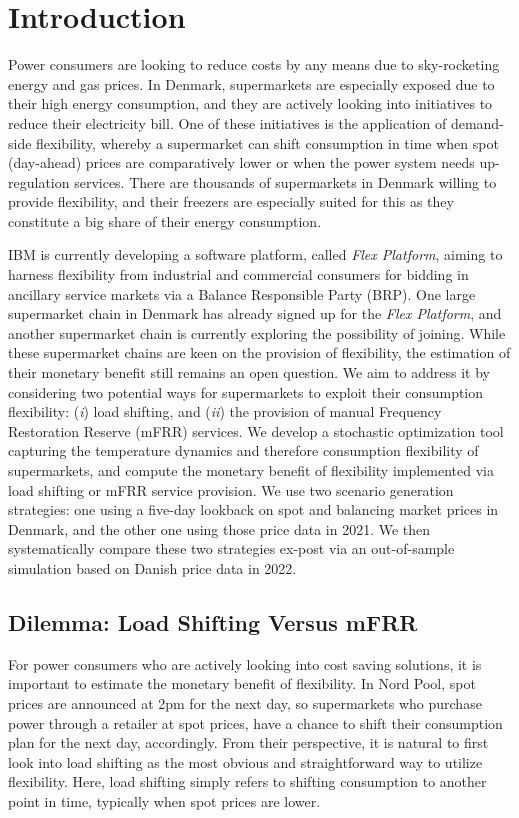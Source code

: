 \documentclass[11pt,a4paper]{article}
\begin{document}
\section{Introduction}


Power consumers are looking to reduce costs by any means due to sky-rocketing energy and gas prices. In Denmark, supermarkets are especially exposed due to their high energy consumption, and they are actively looking into initiatives to reduce their electricity bill. One of these initiatives is the application of demand-side flexibility, whereby a supermarket can shift consumption in time when spot (day-ahead) prices are comparatively lower or when the power system needs up-regulation services. There are thousands of supermarkets in Denmark willing to provide flexibility, and their freezers are especially suited for this as they constitute a big share of their energy consumption.

IBM is currently developing a software platform, called \textit{Flex Platform}, aiming to harness flexibility from industrial and commercial consumers for bidding in ancillary service markets via a Balance Responsible Party (BRP). One large supermarket chain in Denmark has already signed up for the \textit{Flex Platform}, and another supermarket chain is currently exploring the possibility of joining.
While these supermarket chains are keen on the provision of flexibility, the estimation of their monetary benefit still remains an open question. We aim to address it by considering two potential ways for supermarkets to exploit their consumption flexibility: (\textit{i}) load shifting, and (\textit{ii}) the provision of manual Frequency Restoration Reserve (mFRR)
services. We  develop  a stochastic optimization tool capturing the temperature dynamics and therefore consumption flexibility of supermarkets, and compute the monetary benefit of flexibility implemented via load shifting or mFRR service provision. We use two scenario generation  strategies: one using a five-day lookback on spot and balancing market prices in Denmark, and the other one using those price data in 2021. We then systematically compare these two strategies ex-post via an out-of-sample simulation based on Danish price data in 2022.


\subsection{Dilemma: Load Shifting Versus mFRR}
%
For power consumers who are actively looking into cost saving solutions, it is important to estimate the monetary benefit of flexibility. In Nord Pool, spot prices are announced at 2pm for the next day, so supermarkets who purchase power through a retailer at  spot prices, have a chance to shift their consumption plan for the next day, accordingly. From their perspective, it is natural to first look into load shifting as the most obvious and straightforward way to utilize flexibility. Here, load shifting simply refers to shifting consumption to another point in time, typically when spot prices are lower.
\end{document}
